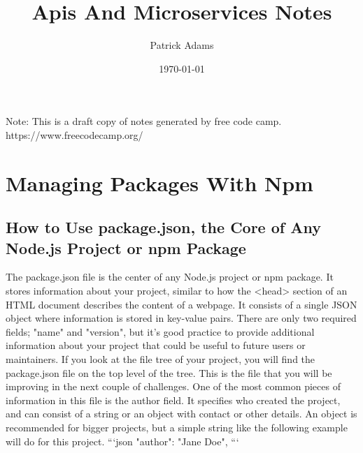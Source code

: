 \documentclass{article}%
\title{Apis And Microservices Notes}%
\author{Patrick Adams}%
\date{\today}%
\begin{document}
%
\normalsize%
\maketitle%
\newpage%
Note: This is a draft copy of notes generated by free code camp.\newline%
%
https://www.freecodecamp.org/%
\newpage%
\tableofcontents%
\section{Managing Packages With Npm}%
\label{sec:ManagingPackagesWithNpm}%
\subsection{How to Use package.json, the Core of Any Node.js Project or npm Package}%
\label{subsec:HowtoUsepackage.json,theCoreofAnyNode.jsProjectornpmPackage}%
The package.json file is the center of any Node.js project or npm package. It stores information about your project, similar to how the <head> section of an HTML document describes the content of a webpage. It consists of a single JSON object where information is stored in key{-}value pairs. There are only two required fields; "name" and "version", but it’s good practice to provide additional information about your project that could be useful to future users or maintainers.\newline%
If you look at the file tree of your project, you will find the package.json file on the top level of the tree. This is the file that you will be improving in the next couple of challenges.\newline%
One of the most common pieces of information in this file is the author field. It specifies who created the project, and can consist of a string or an object with contact or other details. An object is recommended for bigger projects, but a simple string like the following example will do for this project.\newline%
```json\newline%
"author": "Jane Doe",\newline%
```\newline%

%
\end{document}
